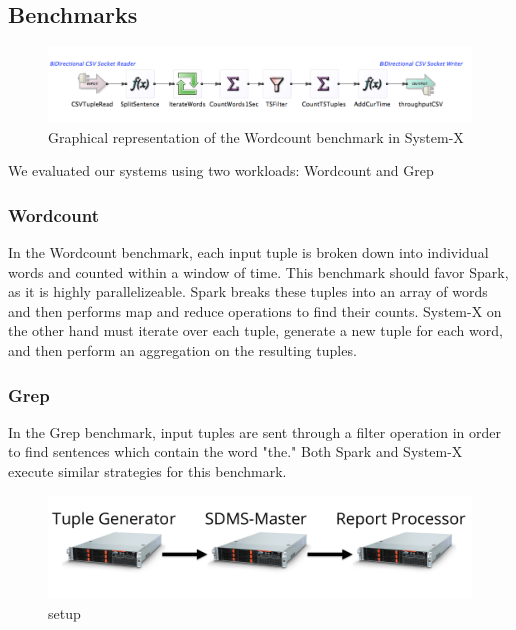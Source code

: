 \subsection{Benchmarks}

\begin{figure}[b]
\centering
\includegraphics[width=1\linewidth]{figures/System-XWorkflow.pdf}
\caption{Graphical representation of the Wordcount benchmark in System-X}
\label{fig:wordcount}
\end{figure}

We evaluated our systems using two workloads: Wordcount and Grep

\subsubsection{Wordcount}
In the Wordcount benchmark, each input tuple is broken down into individual words and counted within a window of time.  This benchmark should favor Spark, as it is highly parallelizeable.   Spark breaks these tuples into an array of words and then performs map and reduce operations to find their counts.  System-X on the other hand must iterate over each tuple, generate a new tuple for each word, and then perform an aggregation on the resulting tuples.

\subsubsection{Grep}
In the Grep benchmark, input tuples are sent through a filter operation in order to find sentences which contain the word "the."  Both Spark and System-X execute similar strategies for this benchmark.

\begin{figure}[t]
\centering
\includegraphics[width=1\linewidth]{figures/diagram.pdf}
\caption{setup}
\label{fig:sb1-tput}
\end{figure}

